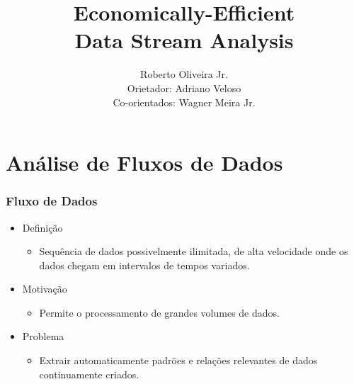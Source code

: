 \documentclass[14pt]{beamer}
\title{Economically-Efficient\\Data Stream Analysis}
\author{\small{Roberto Oliveira Jr.\\Orietador: Adriano Veloso \\Co-orientados: Wagner Meira Jr.}}
\institute{DCC - UFMG - Brazil}
\date{}
\begin{document}
\begin{frame}
\titlepage
\end{frame}

\section{Análise de Fluxos de Dados}

\begin{frame}\frametitle{Fluxo de Dados}

\begin{itemize}
\item Definição
\begin{itemize}
\item Sequência de dados possivelmente ilimitada, de alta velocidade onde os dados chegam em intervalos de tempos variados.
\end{itemize}
\item Motivação
\begin{itemize}
\item Permite o processamento de grandes volumes de dados.
\end{itemize}
\end{itemize}
\begin{itemize}
\item Problema
\begin{itemize}
\item Extrair automaticamente padrões e relações relevantes de dados continuamente criados.
\end{itemize}
\end{itemize}

\end{frame}




\end{document}
